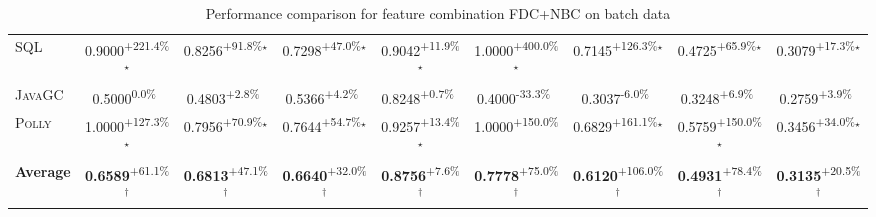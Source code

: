 \begin{table}[htbp]
\begin{tabular}{l|cccc|cccc}
\textsc{SQL} & \cellcolor{green!30}0.9000\textsuperscript{+221.4\%}$^\star$ & \cellcolor{green!30}0.8256\textsuperscript{+91.8\%}$^\star$ & \cellcolor{green!30}0.7298\textsuperscript{+47.0\%}$^\star$ & \cellcolor{green!30}0.9042\textsuperscript{+11.9\%}$^\star$ & \cellcolor{green!30}1.0000\textsuperscript{+400.0\%}$^\star$ & \cellcolor{green!30}0.7145\textsuperscript{+126.3\%}$^\star$ & \cellcolor{green!30}0.4725\textsuperscript{+65.9\%}$^\star$ & \cellcolor{green!30}0.3079\textsuperscript{+17.3\%}$^\star$ \\
\textsc{JavaGC} & \cellcolor{red!30}0.5000\textsuperscript{0.0\%}$^{\,\,\,}$ & \cellcolor{green!30}0.4803\textsuperscript{+2.8\%}$^{\,\,\,}$ & \cellcolor{green!30}0.5366\textsuperscript{+4.2\%}$^{\,\,\,}$ & \cellcolor{green!30}0.8248\textsuperscript{+0.7\%}$^{\,\,\,}$ & \cellcolor{red!30}0.4000\textsuperscript{-33.3\%}$^{\,\,\,}$ & \cellcolor{red!30}0.3037\textsuperscript{-6.0\%}$^{\,\,\,}$ & \cellcolor{green!30}0.3248\textsuperscript{+6.9\%}$^{\,\,\,}$ & \cellcolor{green!30}0.2759\textsuperscript{+3.9\%}$^{\,\,\,}$ \\
\textsc{Polly} & \cellcolor{green!30}1.0000\textsuperscript{+127.3\%}$^\star$ & \cellcolor{green!30}0.7956\textsuperscript{+70.9\%}$^\star$ & \cellcolor{green!30}0.7644\textsuperscript{+54.7\%}$^\star$ & \cellcolor{green!30}0.9257\textsuperscript{+13.4\%}$^\star$ & \cellcolor{green!30}1.0000\textsuperscript{+150.0\%}$^{\,\,\,}$ & \cellcolor{green!30}0.6829\textsuperscript{+161.1\%}$^\star$ & \cellcolor{green!30}0.5759\textsuperscript{+150.0\%}$^\star$ & \cellcolor{green!30}0.3456\textsuperscript{+34.0\%}$^\star$ \\
\hline
\textbf{Average} & \cellcolor{green!30}\textbf{0.6589}\textsuperscript{+61.1\%}$^\dagger$ & \cellcolor{green!30}\textbf{0.6813}\textsuperscript{+47.1\%}$^\dagger$ & \cellcolor{green!30}\textbf{0.6640}\textsuperscript{+32.0\%}$^\dagger$ & \cellcolor{green!30}\textbf{0.8756}\textsuperscript{+7.6\%}$^\dagger$ & \cellcolor{green!30}\textbf{0.7778}\textsuperscript{+75.0\%}$^\dagger$ & \cellcolor{green!30}\textbf{0.6120}\textsuperscript{+106.0\%}$^\dagger$ & \cellcolor{green!30}\textbf{0.4931}\textsuperscript{+78.4\%}$^\dagger$ & \cellcolor{green!30}\textbf{0.3135}\textsuperscript{+20.5\%}$^\dagger$ \\
\hline
\end{tabular}
\caption{Performance comparison for feature combination FDC+NBC on batch data}
\label{tab:combo_FDC_NBC_performance_batch}
\end{table}